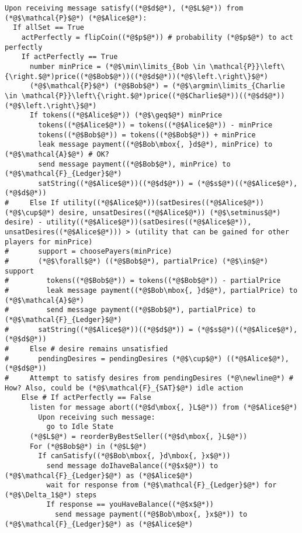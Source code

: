 \begin{lstlisting}[label=satfunc, style=numbers]
Upon receiving message satisfy((*@$d$@*), (*@$L$@*)) from (*@$\mathcal{P}$@*) (*@$Alice$@*):
  If allSet == True
    actPerfectly = flipCoin((*@$p$@*)) # probability (*@$p$@*) to act perfectly
    If actPerfectly == True
      number minPrice = (*@$\min\limits_{Bob \in \mathcal{P}}\left\{\right.$@*)price((*@$Bob$@*))((*@$d$@*))(*@$\left.\right\}$@*)
      (*@$\mathcal{P}$@*) (*@$Bob$@*) = (*@$\argmin\limits_{Charlie \in \mathcal{P}}\left\{\right.$@*)price((*@$Charlie$@*))((*@$d$@*))(*@$\left.\right\}$@*)
      If tokens((*@$Alice$@*)) (*@$\geq$@*) minPrice
        tokens((*@$Alice$@*)) = tokens((*@$Alice$@*)) - minPrice
        tokens((*@$Bob$@*)) = tokens((*@$Bob$@*)) + minPrice
        leak message payment((*@$Bob\mbox{, }d$@*), minPrice) to (*@$\mathcal{A}$@*) # OK?
        send message payment((*@$Bob$@*), minPrice) to (*@$\mathcal{F}_{Ledger}$@*)
        satString((*@$Alice$@*))((*@$d$@*)) = (*@$s$@*)((*@$Alice$@*), (*@$d$@*))
#     Else If utility((*@$Alice$@*))(satDesires((*@$Alice$@*)) (*@$\cup$@*) desire, unsatDesires((*@$Alice$@*)) (*@$\setminus$@*) desire) - utility((*@$Alice$@*))(satDesires((*@$Alice$@*)), unsatDesires((*@$Alice$@*))) > (utility that can be gained for other players for minPrice)
#       support = choosePayers(minPrice)
#       (*@$\forall$@*) ((*@$Bob$@*), partialPrice) (*@$\in$@*) support
#         tokens((*@$Bob$@*)) = tokens((*@$Bob$@*)) - partialPrice
#         leak message payment((*@$Bob\mbox{, }d$@*), partialPrice) to (*@$\mathcal{A}$@*)
#         send message payment((*@$Bob$@*), partialPrice) to (*@$\mathcal{F}_{Ledger}$@*)
#       satString((*@$Alice$@*))((*@$d$@*)) = (*@$s$@*)((*@$Alice$@*), (*@$d$@*))
#     Else # desire remains unsatisfied
#       pendingDesires = pendingDesires (*@$\cup$@*) ((*@$Alice$@*), (*@$d$@*))
#     Attempt to satisfy desires from pendingDesires (*@\newline@*) # How? Also, could be (*@$\mathcal{F}_{SAT}$@*) idle action
    Else # If actPerfectly == False
      listen for message abort((*@$d\mbox{, }L$@*)) from (*@$Alice$@*)
        Upon receiving such message:
          go to Idle State
      (*@$L$@*) = reorderByBestSeller((*@$d\mbox{, }L$@*))
      For (*@$Bob$@*) in (*@$L$@*)
        If canSatisfy((*@$Bob\mbox{, }d\mbox{, }x$@*))
          send message doIhaveBalance((*@$x$@*)) to (*@$\mathcal{F}_{Ledger}$@*) as (*@$Alice$@*)
          wait for response from (*@$\mathcal{F}_{Ledger}$@*) for (*@$\Delta_1$@*) steps
          If response == youHaveBalance((*@$x$@*))
            send message payment((*@$Bob\mbox{, }x$@*)) to (*@$\mathcal{F}_{Ledger}$@*) as (*@$Alice$@*)

\end{lstlisting}
